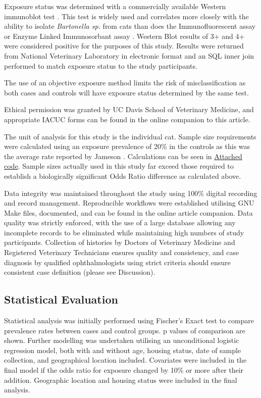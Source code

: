 \documentclass[11pt,twocolumn]{article}
\begin{document}
	Exposure status was determined with a commercially available Western immunoblot test \cite{febart}. This test is widely used and correlates more closely with the ability to isolate \emph{Bartonella sp.} from cats than does the Immunofluorescent assay or Enzyme Linked Immunosorbant assay \cite{Jr1995}. 
	Western Blot results of 3+ and 4+ were considered positive for the purposes of this study. 
	Results were returned from National Veterinary Laboratory in electronic format and an SQL inner join performed to match exposure status to the study participants.

	The use of an objective exposure method limits the risk of misclassification as both cases and controls will have exposure status determined by the same test.


	Ethical permission was granted by UC Davis School of Veterinary Medicine, and appropriate IACUC forms can be found in the online companion to this article.

	The unit of analysis for this study is the individual cat. 
	Sample size requirements were calculated using an exposure prevalence of 20\% in the controls as this was the average rate reported by Jameson \cite{Jameson1995a}. Calculations can be seen in \hyperref[fig:samplesizecalc]{Attached code}.
	Sample sizes actually used in this study far exceed those required to establish a biologically significant Odds Ratio difference as calculated above.


	Data integrity was maintained throughout the study using 100\% digital recording and record management. 
	Reproducible workflows were established utilising GNU Make files, documented, and can be found in the online article companion.
	Data quality was strictly enforced, with the use of a large database allowing any incomplete records to be eliminated while maintaining high numbers of study participants.
	Collection of histories by Doctors of Veterinary Medicine and Registered Veterinary Technicians ensures quality and consistency, and case diagnosis by qualified ophthalmologists using strict criteria should ensure consistent case definition (please see Discussion).


	\subsection{Statistical Evaluation}

		Statistical analysis was initially performed using Fischer's Exact test to compare prevalence rates between cases and control groups. p values of comparison are shown.
		Further modelling was undertaken utilising an unconditional logistic regression model, both with and without age, housing status, date of sample collection, and geographical location included. 
		Covariates were included in the final model if the odds ratio for exposure changed by 10\% or more after their addition.
		Geographic location and housing status were included in the final analysis.
\end{document}
